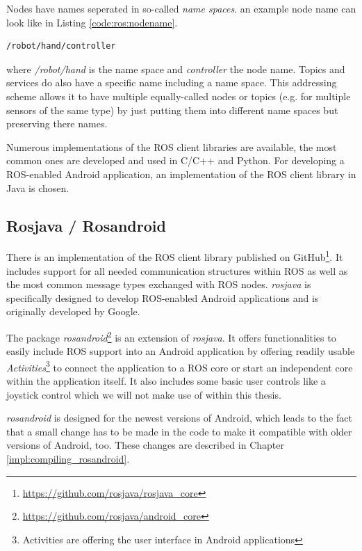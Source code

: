 Nodes have names seperated in so-called \textit{name spaces}. an example node name can look like in Listing \ref{code:ros:nodename}.
\begin{lstlisting}[caption={An example ROS node name},label=code:ros:nodename]
/robot/hand/controller
\end{lstlisting}


where \textit{/robot/hand} is the name space and \textit{controller} the node name. Topics and services do also have a specific name including a name space. This addressing scheme allows it to have multiple equally-called nodes or topics (e.g. for multiple sensors of the same type) by just putting them into different name spaces but preserving there names.

Numerous implementations of the ROS client libraries are available, the most common ones are developed and used in C/C++ and Python\cite{ros:client_libraries}. For developing a ROS-enabled Android application, an implementation of the ROS client library in Java is chosen. 

\subsection{Rosjava / Rosandroid}

There is an implementation of the ROS client library published on GitHub\footnote{\url{https://github.com/rosjava/rosjava_core}}. It includes support for all needed communication structures within ROS as well as the most common message types exchanged with ROS nodes. \textit{rosjava} is specifically designed to develop ROS-enabled Android applications and is originally developed by Google\cite{ros:rosjava:readme}.

The package \textit{rosandroid}\footnote{\url{https://github.com/rosjava/android_core}} is an extension of \textit{rosjava}. It offers functionalities to easily include ROS support into an Android application by offering readily usable \textit{Activities}\footnote{Activities are offering the user interface in Android applications} to connect the application to a ROS core or start an independent core within the application itself. It also includes some basic user controls like a joystick control which we will not make use of within this thesis.

\textit{rosandroid} is designed for the newest versions of Android, which leads to the fact that a small change has to be made in the code to make it compatible with older versions of Android, too. These changes are described in Chapter \ref{impl:compiling_rosandroid}.

